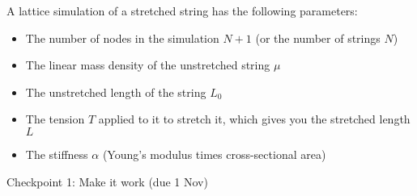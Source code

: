 \documentclass[12pt]{article}
\begin{document}
  
  A lattice simulation of a stretched string has the following parameters:
    \begin{itemize}
      \item{The number of nodes in the simulation $N+1$ (or the number of strings $N$)}
        \item{The linear mass density of the unstretched string $\mu$}
        \item{The unstretched length of the string $L_0$}
        \item{The tension $T$ applied to it to stretch it, which gives you the stretched length $L$}
        \item{The stiffness $\alpha$ (Young's modulus times cross-sectional area)}
      \end{itemize}

\newpage

\begin{center}\large Checkpoint 1: Make it work (due 1 Nov)\end{center}
\end{document}
